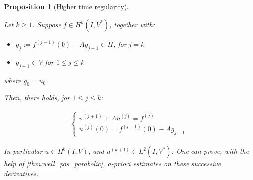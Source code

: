 \documentclass[english,a4paper,10pt,oneside]{scrbook}	%
\theoremstyle{break}
\newtheorem{prop}[equation]{Proposition}
\theoremstyle{remark}
\begin{document}
\begin{prop}[Higher time regularity]
\label{prop:time_reg}

Let $k\geq 1$. Suppose $f \in H^k(I, V^*)$, together with:

\begin{itemize}
	\item $g_j:=f^{(j-1)}(0)-Ag_{j-1} \in H$, for $j = k$
	\item $g_{j-1} \in V$ for $1\leq j\leq k$
\end{itemize}

where $g_0 = u_0$.

Then, there holds, for $1\leq j\leq k$:

\begin{align*}
\left\{\begin{matrix}
u^{(j+1)}+Au^{(j)} = f^{(j)}
\\
u^{(j)}(0) = f^{(j-1)}(0) - Ag_{j-1}
\end{matrix}\right.
\end{align*}

In particular $u \in H^k(I,V)$, and $u^{(k+1)} \in L^2(I,V^*)$. One can prove, with the help of \cref{thm:well_pos_parabolic}, a-priori estimates on these successive derivatives.


\end{prop}
\end{document}
